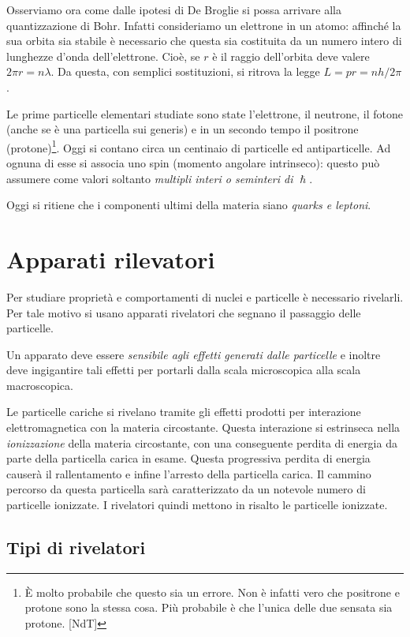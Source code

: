 Osserviamo ora come dalle ipotesi di De Broglie si possa arrivare alla quantizzazione di Bohr. Infatti consideriamo un elettrone in un atomo: affinché la sua orbita sia stabile è necessario che questa sia costituita da un numero intero di lunghezze d'onda dell'elettrone. Cioè, se $r$ è il raggio dell'orbita deve valere $2\pi r= n\lambda$. Da questa, con semplici sostituzioni, si ritrova la legge $L = pr = nh/2\pi$.

Le prime particelle elementari studiate sono state l'elettrone, il neutrone, il fotone (anche se è una particella sui generis) e in un secondo tempo il positrone (protone)\footnote{È molto probabile che questo sia un errore. Non è infatti vero che positrone e protone sono la stessa cosa. Più probabile è che l'unica delle due sensata sia protone. [NdT]}. Oggi si contano circa un centinaio di particelle ed antiparticelle. Ad ognuna di esse si associa uno spin (momento angolare intrinseco): questo può assumere come valori soltanto \textit{multipli interi o seminteri di $\hslash$}.

Oggi si ritiene che i componenti ultimi della materia siano \textit{quarks e leptoni}.

\chapter{Apparati rilevatori}
Per studiare proprietà e comportamenti di nuclei e
particelle è necessario rivelarli. Per tale motivo si usano apparati rivelatori
che segnano il passaggio delle particelle.

Un apparato deve essere \textit{sensibile agli effetti generati dalle
particelle} e inoltre deve ingigantire tali effetti per portarli dalla scala
microscopica alla scala macroscopica.

Le particelle cariche si rivelano tramite gli effetti prodotti per interazione
elettromagnetica con la materia circostante. Questa interazione si estrinseca
nella \textit{ionizzazione} della materia circostante, con una conseguente
perdita di energia da parte della particella carica in esame. Questa
progressiva perdita di energia causerà il rallentamento e infine l'arresto
della particella carica. Il cammino percorso da questa particella sarà
caratterizzato da un notevole numero di particelle ionizzate. I rivelatori
quindi mettono in risalto le particelle ionizzate.

\section{Tipi di rivelatori}

